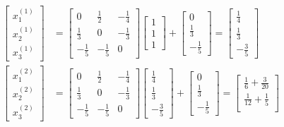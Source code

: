 		\begin{align}
			\begin{bmatrix}
				x_{1}^{(1)} \\
				x_{2}^{(1)} \\
				x_{3}^{(1)}
			\end{bmatrix}
			&=
			\begin{bmatrix}
				0 & \frac{1}{2} & -\frac{1}{4} \\
				\frac{1}{3} & 0 & -\frac{1}{3} \\
				-\frac{1}{5} & -\frac{1}{5} & 0
			\end{bmatrix}
			\begin{bmatrix}
				1 \\
				1 \\
				1
			\end{bmatrix}
			+
			\begin{bmatrix}
				0 \\
				\frac{1}{3} \\
				-\frac{1}{5}
			\end{bmatrix} =
			\begin{bmatrix}
				\frac{1}{4} \\
				\frac{1}{3} \\
				-\frac{3}{5}
			\end{bmatrix}
			& \\
			\begin{bmatrix}
				x_{1}^{(2)} \\
				x_{2}^{(2)} \\
				x_{3}^{(2)}
			\end{bmatrix}
			&=
			\begin{bmatrix}
				0 & \frac{1}{2} & -\frac{1}{4} \\
				\frac{1}{3} & 0 & -\frac{1}{3} \\
				-\frac{1}{5} & -\frac{1}{5} & 0
			\end{bmatrix}
			\begin{bmatrix}
				\frac{1}{4} \\
				\frac{1}{3} \\
				-\frac{3}{5}
			\end{bmatrix}
			+
			\begin{bmatrix}
				0 \\
				\frac{1}{3} \\
				-\frac{1}{5}
			\end{bmatrix} =
			\begin{bmatrix}
				\frac{1}{6} + \frac{3}{20} \\
				\frac{1}{12} + \frac{1}{5} \\

\end{bmatrix}
\end{align}
